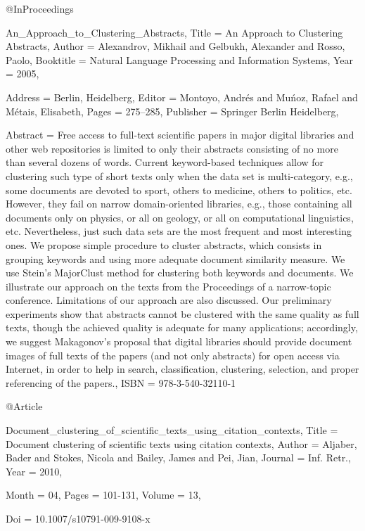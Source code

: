 

@InProceedings{An_Approach_to_Clustering_Abstracts,
  Title                    = {An Approach to Clustering Abstracts},
  Author                   = {Alexandrov, Mikhail
and Gelbukh, Alexander
and Rosso, Paolo},
  Booktitle                = {Natural Language Processing and Information Systems},
  Year                     = {2005},

  Address                  = {Berlin, Heidelberg},
  Editor                   = {Montoyo, Andr{\'e}s
and Mu{\'{n}}oz, Rafael
and M{\'e}tais, Elisabeth},
  Pages                    = {275--285},
  Publisher                = {Springer Berlin Heidelberg},

  Abstract                 = {Free access to full-text scientific papers in major digital libraries and other web repositories is limited to only their abstracts consisting of no more than several dozens of words. Current keyword-based techniques allow for clustering such type of short texts only when the data set is multi-category, e.g., some documents are devoted to sport, others to medicine, others to politics, etc. However, they fail on narrow domain-oriented libraries, e.g., those containing all documents only on physics, or all on geology, or all on computational linguistics, etc. Nevertheless, just such data sets are the most frequent and most interesting ones. We propose simple procedure to cluster abstracts, which consists in grouping keywords and using more adequate document similarity measure. We use Stein's MajorClust method for clustering both keywords and documents. We illustrate our approach on the texts from the Proceedings of a narrow-topic conference. Limitations of our approach are also discussed. Our preliminary experiments show that abstracts cannot be clustered with the same quality as full texts, though the achieved quality is adequate for many applications; accordingly, we suggest Makagonov's proposal that digital libraries should provide document images of full texts of the papers (and not only abstracts) for open access via Internet, in order to help in search, classification, clustering, selection, and proper referencing of the papers.},
  ISBN                     = {978-3-540-32110-1}
}

@Article{Document_clustering_of_scientific_texts_using_citation_contexts,
  Title                    = {Document clustering of scientific texts using citation contexts},
  Author                   = {Aljaber, Bader and Stokes, Nicola and Bailey, James and Pei, Jian},
  Journal                  = {Inf. Retr.},
  Year                     = {2010},

  Month                    = {04},
  Pages                    = {101-131},
  Volume                   = {13},

  Doi                      = {10.1007/s10791-009-9108-x}
}

